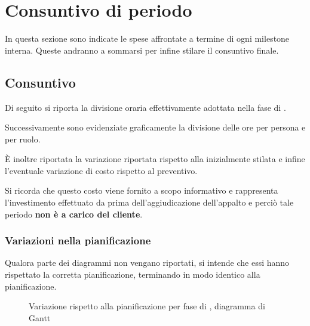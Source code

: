 
\section{Consuntivo di periodo} \label{sec:consuntivo}
In questa sezione sono indicate le spese affrontate a termine di ogni milestone interna. Queste andranno a sommarsi per infine stilare il consuntivo finale.



\newcommand{\introconsuntivo}[1]
{
Di seguito si riporta la divisione oraria effettivamente adottata nella fase di #1.

Successivamente sono evidenziate graficamente la divisione delle ore per persona e per ruolo. 

È inoltre riportata la variazione riportata rispetto alla \gloss{baseline} inizialmente stilata e infine l'eventuale variazione di costo rispetto al preventivo.
}

\subsection{Consuntivo \AR}
\introconsuntivo{\AR}

Si ricorda che questo costo viene fornito a scopo informativo e rappresenta l'investimento effettuato da {\hx} prima dell'aggiudicazione dell'appalto e perciò tale periodo \textbf{non è a carico del cliente}. 

\subsubsection{Variazioni nella pianificazione}

Qualora parte dei diagrammi non vengano riportati, si intende che essi hanno rispettato la corretta pianificazione, terminando in modo identico alla pianificazione.

\begin{figure}[H]
\label{tab:cgen1}

  \caption{Variazione rispetto alla pianificazione per fase di \AR, diagramma di Gantt}
\end{figure}

